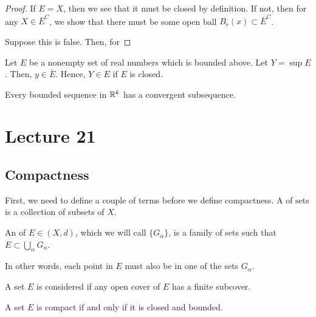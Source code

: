 \documentclass{book}
\begin{document}
\begin{proof}
    If $E = X$, then we see that it must be closed by definition. If not, then for any $X \in \overline{E}^C$, we show that there must be some open ball $B_r(x) \subset \overline{E}^C$. 

    Suppose this is false. Then, for 
\end{proof}

\begin{thm}
    Let $E$ be a nonempty set of real numbers which is bounded above. Let $Y = \sup E$. Then, $y \in \overline E$. Hence, $Y \in E$ if $E$ is closed.
\end{thm}

\begin{thm}
    Every bounded sequence in $\mathbb{R}^k$ has a convergent subsequence.
\end{thm}

\section{Lecture 21}
\subsection{Compactness}
First, we need to define a couple of terms before we define compactness. A  of sets is a collection of subsets of $X$. 

\begin{defn}
    An  of $E \in (X, d)$, which we will call $\{ G_\alpha \}$, is a family of sets such that $E \subset \bigcup_\alpha G_\alpha$.

    In other words, each point in $E$ must also be in one of the sets $G_\alpha$.
\end{defn}

\begin{defn}[Compact]
    A set $E$ is considered  if any open cover of $E$ has a finite subcover.
\end{defn}

\begin{thm}
    A set $E$ is compact if and only if it is closed and bounded.
\end{thm}
\end{document}
